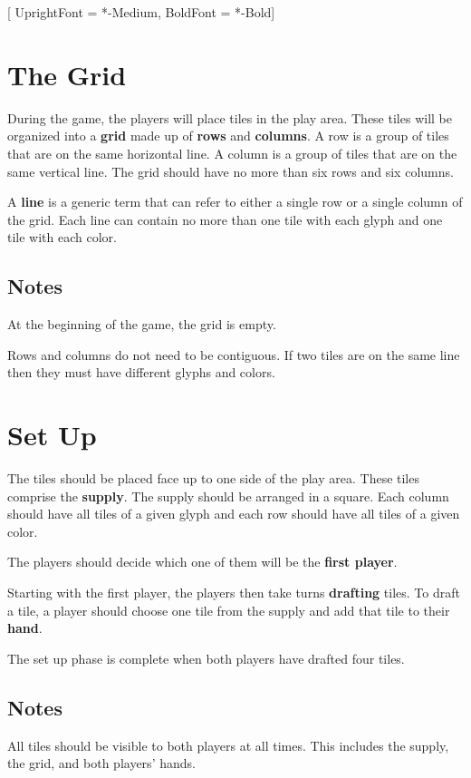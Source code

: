 \setmainfont{Quicksand}[
	UprightFont = *-Medium,
	BoldFont = *-Bold]
\raggedright

\section{The Grid}
During the game, the players will place tiles in the play area. These tiles will be organized into a \textbf{grid} made up of \textbf{rows} and \textbf{columns}. A row is a group of tiles that are on the same horizontal line.  A column is a group of tiles that are on the same vertical line. The grid should have no more than six rows and six columns.

A \textbf{line} is a generic term that can refer to either a single row or a single column of the grid. Each line can contain no more than one tile with each glyph and one tile with each color.

\subsection{Notes}
At the beginning of the game, the grid is empty.

Rows and columns do not need to be contiguous.
If two tiles are on the same line then they must have different glyphs and colors.

\section{Set Up}
The tiles should be placed face up to one side of the play area. These tiles comprise the \textbf{supply}. The supply should be arranged in a square. Each column should have all tiles of a given glyph and each row should have all tiles of a given color.

The players should decide which one of them will be the \textbf{first player}.

Starting with the first player, the players then take turns \textbf{drafting} tiles. To draft a tile, a player should choose one tile from the supply and add that tile to their \textbf{hand}.

The set up phase is complete when both players have drafted four tiles.

\subsection{Notes}
All tiles should be visible to both players at all times.  This includes the supply, the grid, and both players' hands.

